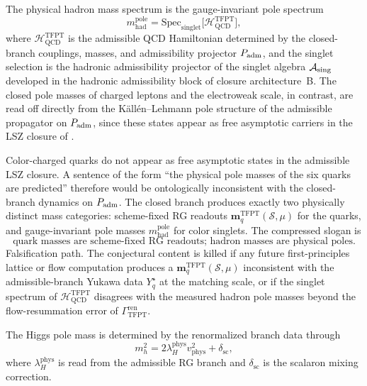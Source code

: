 \begin{conjecture}
\label{thm:hadron_pole_masses_singlet_spectrum}
The physical hadron mass spectrum is the gauge-invariant pole spectrum
\[
m_{\mathrm{had}}^{\mathrm{pole}}
=
\mathrm{Spec}_{\mathrm{singlet}}
\bigl[\mathcal H_{\mathrm{QCD}}^{\mathrm{TFPT}}\bigr],
\]
where $\mathcal H_{\mathrm{QCD}}^{\mathrm{TFPT}}$ is the admissible QCD Hamiltonian determined by the
closed-branch couplings, masses, and admissibility projector $P_{\mathrm{adm}}$, and the singlet selection is
the hadronic admissibility projector of the singlet algebra $\mathcal A_{\mathrm{sing}}$ developed in the hadronic
admissibility block of closure architecture~B. The closed pole
masses of charged leptons and the electroweak scale, in contrast, are read off directly from the
Källén--Lehmann pole structure of the admissible propagator on $P_{\mathrm{adm}}$, since these states appear as
free asymptotic carriers in the LSZ closure of .
\end{conjecture}

\begin{remark}
Color-charged quarks do not appear as free asymptotic states in the admissible LSZ closure. A
sentence of the form ``the physical pole masses of the six quarks are predicted'' therefore would be
ontologically inconsistent with the closed-branch dynamics on $P_{\mathrm{adm}}$. The closed branch produces
exactly two physically distinct mass categories: scheme-fixed RG readouts
$\mathbf m_q^{\mathrm{TFPT}}(\mathcal S,\mu)$ for the quarks, and gauge-invariant pole masses
$m_{\mathrm{had}}^{\mathrm{pole}}$ for color singlets. The compressed slogan is
\[
\boxed{\text{quark masses are scheme-fixed RG readouts; hadron masses are physical poles.}}
\]
Falsification path. The conjectural content is killed if any future first-principles lattice or
flow computation produces a $\mathbf m_q^{\mathrm{TFPT}}(\mathcal S,\mu)$ inconsistent with the
admissible-branch Yukawa data $Y_q^\star$ at the matching scale, or if the singlet spectrum of
$\mathcal H_{\mathrm{QCD}}^{\mathrm{TFPT}}$ disagrees with the measured hadron pole masses beyond the
flow-resummation error of $\Gamma_{\mathrm{TFPT}}^{\mathrm{ren}}$.
\end{remark}

\begin{conjecture}
\label{thm:higgs_pole_readout_rg_branch}
The Higgs pole mass is determined by the renormalized branch data through
\[
m_h^2=2\lambda_H^{\mathrm{phys}}v_{\mathrm{phys}}^2+\delta_{\mathrm{sc}},
\]
where \(\lambda_H^{\mathrm{phys}}\) is read from the admissible RG branch and
\(\delta_{\mathrm{sc}}\) is the scalaron mixing correction.
\end{conjecture}

